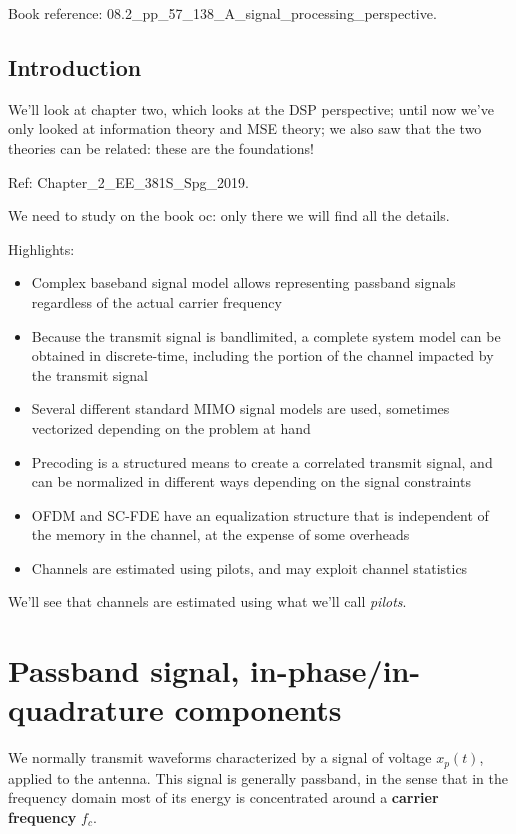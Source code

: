 \documentclass[a4paper, 12pt]{book}
\begin{document}
\textcolor{green!60!black}{Book reference: 08.2\_pp\_57\_138\_A\_signal\_processing\_perspective.}

\subsection{Introduction}

We'll look at chapter two, which looks at the DSP perspective; until now we've only looked at information theory and MSE theory; we also saw that the two theories can be related: these are the foundations!

\textcolor{green!60!black}{\small Ref: Chapter\_2\_EE\_381S\_Spg\_2019.}

We need to study on the book oc: only there we will find all the details.

Highlights:
\begin{itemize}
    \item \scriptsize Complex baseband signal model allows representing passband signals regardless of the actual carrier frequency
    \item Because the transmit signal is bandlimited, a complete system model can be obtained in discrete-time, including the portion of the channel impacted by the transmit signal
    \item Several different standard MIMO signal models are used, sometimes vectorized depending on the problem at hand
    \item Precoding is a structured means to create a correlated transmit signal, and can be normalized in different ways depending on the signal constraints
    \item OFDM and SC-FDE have an equalization structure that is independent of the memory in the channel, at the expense of some overheads
    \item Channels are estimated using pilots, and may exploit channel statistics
\end{itemize}

We'll see that channels are estimated using what we'll call \textit{pilots}.

\section{Passband signal, in-phase/in-quadrature components}

We normally transmit waveforms characterized by a signal of voltage $x_p(t)$, applied to the antenna. This signal is generally passband, in the sense that in the frequency domain most of its energy is concentrated around a \textbf{carrier frequency} $f_c$.
\end{document}
